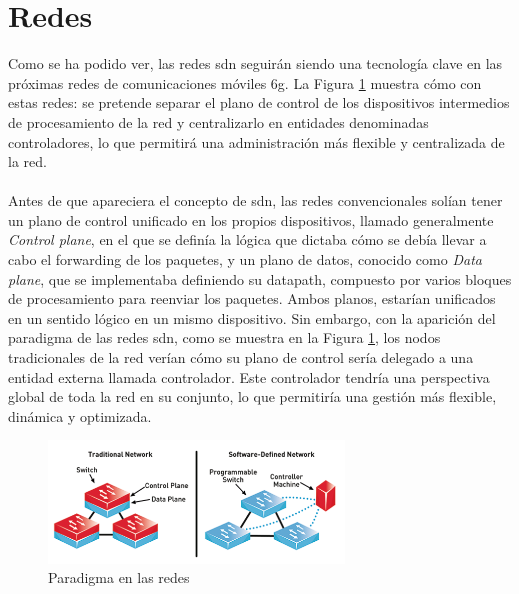 \section{Redes }
\label{sec:6gIoT_sdn}


Como se ha podido ver, las redes \gls{sdn} seguirán siendo una tecnología clave en las próximas redes de comunicaciones móviles \gls{6g}. La Figura \ref{fig:sdnParadig} muestra cómo con estas redes: se pretende separar el plano de control de los dispositivos intermedios de procesamiento de la red y centralizarlo en entidades denominadas controladores, lo que permitirá una administración más flexible y centralizada de la red.\\
\\
Antes de que apareciera el concepto de \gls{sdn}, las redes convencionales solían tener un plano de control unificado en los propios dispositivos, llamado generalmente \textit{Control plane}, en el que se definía la lógica que dictaba cómo se debía llevar a cabo el forwarding de los paquetes, y un plano de datos, conocido como \textit{Data plane}, que se implementaba definiendo su datapath, compuesto por varios bloques de procesamiento para reenviar los paquetes. Ambos planos, estarían unificados en un sentido lógico en un mismo dispositivo. Sin embargo, con la aparición del paradigma de las redes \gls{sdn}, como se muestra en la Figura \ref{fig:sdnParadig}, los nodos tradicionales de la red verían cómo su plano de control sería delegado a una entidad externa llamada controlador. Este controlador tendría una perspectiva global de toda la red en su conjunto, lo que permitiría una gestión más flexible, dinámica y optimizada.

\begin{figure}[ht]
    \centering
    \includegraphics[width=0.7\textwidth]{archivos/img/intro/sdn.png}
    \caption{Paradigma en las redes  \cite{carrascal2020diseno}}
    \label{fig:sdnParadig}
\end{figure}

